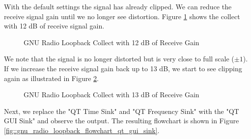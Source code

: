\documentclass{article}
\begin{document}
With the default settings the signal has already clipped. We can reduce the receive signal gain until we no longer see distortion. Figure \ref{fig::gnu_radio_loopback_rx_gain_12dB} shows the collect with 12 dB of receive signal gain.

\begin{figure}[H]
	\centerline{}
	\caption{GNU Radio Loopback Collect with 12 dB of Receive Gain}
	\label{fig::gnu_radio_loopback_rx_gain_12dB}
\end{figure}

We note that the signal is no longer distorted but is very close to full scale ($\pm 1$). If we increase the receive signal gain back up to 13 dB, we start to see clipping again as illustrated in Figure \ref{fig::gnu_radio_loopback_rx_gain_13dB}.

\begin{figure}[H]
	\centerline{}
	\caption{GNU Radio Loopback Collect with 13 dB of Receive Gain}
	\label{fig::gnu_radio_loopback_rx_gain_13dB}
\end{figure}

Next, we replace the "QT Time Sink" and "QT Frequency Sink" with the "QT GUI Sink" and observe the output. The resulting flowchart is shown in Figure \ref{fig::gnu_radio_loopback_flowchart_qt_gui_sink}.
\end{document}
